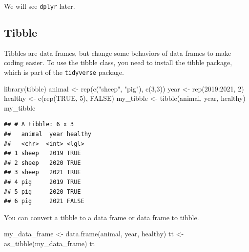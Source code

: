 \documentclass[
]{book}
\newenvironment{Shaded}{\begin{snugshade}}{\end{snugshade}}
\newcommand{\ConstantTok}[1]{\textcolor[rgb]{0.00,0.00,0.00}{#1}}
\newcommand{\DecValTok}[1]{\textcolor[rgb]{0.00,0.00,0.81}{#1}}
\newcommand{\FunctionTok}[1]{\textcolor[rgb]{0.00,0.00,0.00}{#1}}
\newcommand{\NormalTok}[1]{#1}
\newcommand{\OtherTok}[1]{\textcolor[rgb]{0.56,0.35,0.01}{#1}}
\newcommand{\SpecialCharTok}[1]{\textcolor[rgb]{0.00,0.00,0.00}{#1}}
\newcommand{\StringTok}[1]{\textcolor[rgb]{0.31,0.60,0.02}{#1}}
\begin{document}
We will see \texttt{dplyr} later.

\hypertarget{tibble}{%
\subsection{Tibble}\label{tibble}}

Tibbles are data frames, but change some behaviors of data frames to make coding easier. To use the tibble class, you need to install the tibble package, which is part of the \texttt{tidyverse} package.

\begin{Shaded}
\begin{Highlighting}[]
\FunctionTok{library}\NormalTok{(tibble)}
\NormalTok{animal }\OtherTok{\textless{}{-}} \FunctionTok{rep}\NormalTok{(}\FunctionTok{c}\NormalTok{(}\StringTok{"sheep"}\NormalTok{, }\StringTok{"pig"}\NormalTok{), }\FunctionTok{c}\NormalTok{(}\DecValTok{3}\NormalTok{,}\DecValTok{3}\NormalTok{))}
\NormalTok{year }\OtherTok{\textless{}{-}} \FunctionTok{rep}\NormalTok{(}\DecValTok{2019}\SpecialCharTok{:}\DecValTok{2021}\NormalTok{, }\DecValTok{2}\NormalTok{)}
\NormalTok{healthy }\OtherTok{\textless{}{-}} \FunctionTok{c}\NormalTok{(}\FunctionTok{rep}\NormalTok{(}\ConstantTok{TRUE}\NormalTok{, }\DecValTok{5}\NormalTok{), }\ConstantTok{FALSE}\NormalTok{)}
\NormalTok{my\_tibble }\OtherTok{\textless{}{-}} \FunctionTok{tibble}\NormalTok{(animal, year, healthy)}
\NormalTok{my\_tibble}
\end{Highlighting}
\end{Shaded}

\begin{verbatim}
## # A tibble: 6 x 3
##   animal  year healthy
##   <chr>  <int> <lgl>  
## 1 sheep   2019 TRUE   
## 2 sheep   2020 TRUE   
## 3 sheep   2021 TRUE   
## 4 pig     2019 TRUE   
## 5 pig     2020 TRUE   
## 6 pig     2021 FALSE
\end{verbatim}

You can convert a tibble to a data frame or data frame to tibble.

\begin{Shaded}
\begin{Highlighting}[]
\NormalTok{my\_data\_frame }\OtherTok{\textless{}{-}} \FunctionTok{data.frame}\NormalTok{(animal, year,  healthy)}
\NormalTok{tt }\OtherTok{\textless{}{-}} \FunctionTok{as\_tibble}\NormalTok{(my\_data\_frame)}
\NormalTok{tt}
\end{Highlighting}
\end{Shaded}
\end{document}
